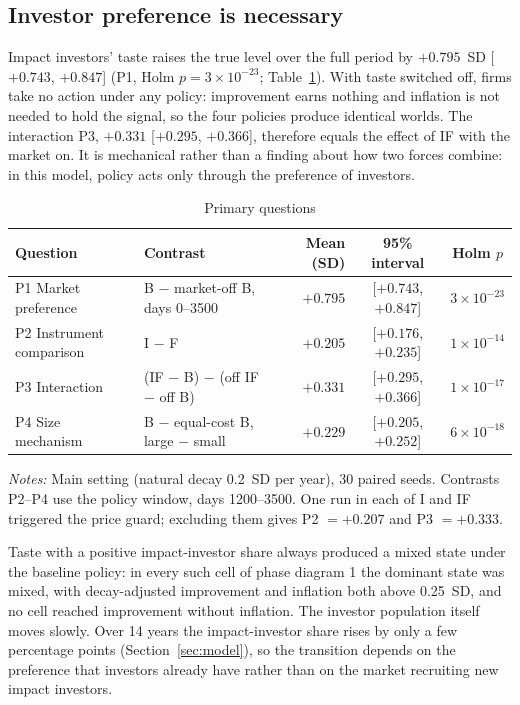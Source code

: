 \documentclass[11pt]{article}
\begin{document}
\subsection{Investor preference is necessary}\label{sec:preference}

Impact investors' taste raises the true level over the full period by $+0.795$~SD [$+0.743$, $+0.847$] (P1, Holm $p = 3\times10^{-23}$; Table~\ref{tab:primary}). With taste switched off, firms take no action under any policy: improvement earns nothing and inflation is not needed to hold the signal, so the four policies produce identical worlds. The interaction P3, $+0.331$ [$+0.295$, $+0.366$], therefore equals the effect of IF with the market on. It is mechanical rather than a finding about how two forces combine: in this model, policy acts only through the preference of investors.

\begin{table}[t]
\centering
\small
\begin{threeparttable}
\caption{Primary questions}
\label{tab:primary}
\begin{tabular}{@{}llrcc@{}}
\toprule
Question & Contrast & Mean (SD) & 95\% interval & Holm $p$ \\
\midrule
P1 Market preference & B $-$ market-off B, days 0--3500 & $+0.795$ & [$+0.743$, $+0.847$] & $3\times10^{-23}$ \\
P2 Instrument comparison & I $-$ F & $+0.205$ & [$+0.176$, $+0.235$] & $1\times10^{-14}$ \\
P3 Interaction & (IF $-$ B) $-$ (off IF $-$ off B) & $+0.331$ & [$+0.295$, $+0.366$] & $1\times10^{-17}$ \\
P4 Size mechanism & B $-$ equal-cost B, large $-$ small & $+0.229$ & [$+0.205$, $+0.252$] & $6\times10^{-18}$ \\
\bottomrule
\end{tabular}
\begin{tablenotes}[flushleft]\footnotesize
\item \textit{Notes:} Main setting (natural decay 0.2~SD per year), 30 paired seeds. Contrasts P2--P4 use the policy window, days 1200--3500. One run in each of I and IF triggered the price guard; excluding them gives P2 $= +0.207$ and P3 $= +0.333$.
\end{tablenotes}
\end{threeparttable}
\end{table}

Taste with a positive impact-investor share always produced a mixed state under the baseline policy: in every such cell of phase diagram 1 the dominant state was mixed, with decay-adjusted improvement and inflation both above 0.25~SD, and no cell reached improvement without inflation. The investor population itself moves slowly. Over 14 years the impact-investor share rises by only a few percentage points (Section~\ref{sec:model}), so the transition depends on the preference that investors already have rather than on the market recruiting new impact investors.
\end{document}
